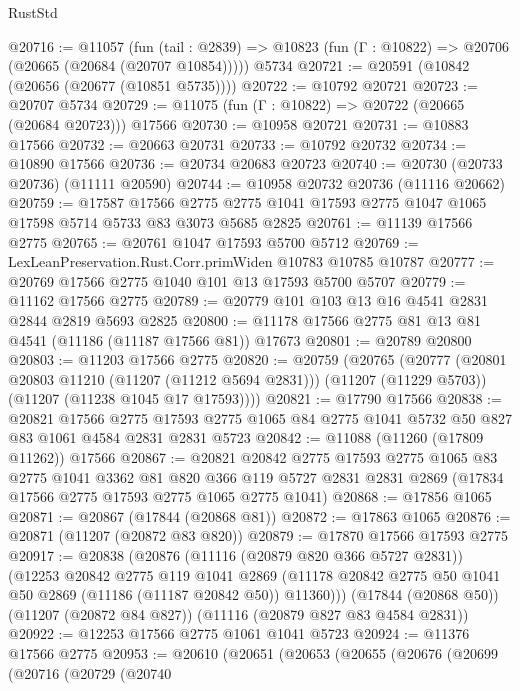 \begin{lexlean}{RustStd}
\begin{coremodule}
@20716 := @11057
    (fun (tail : @2839) => @10823 (fun (Γ : @10822) => @20706 (@20665 (@20684 (@20707 @10854)))))
    @5734
@20721 := @20591 (@10842 (@20656 (@20677 (@10851 @5735))))
@20722 := @10792 @20721
@20723 := @20707 @5734
@20729 := @11075 (fun (Γ : @10822) => @20722 (@20665 (@20684 @20723))) @17566
@20730 := @10958 @20721
@20731 := @10883 @17566
@20732 := @20663 @20731
@20733 := @10792 @20732
@20734 := @10890 @17566
@20736 := @20734 @20683 @20723
@20740 := @20730 (@20733 @20736) (@11111 @20590)
@20744 := @10958 @20732 @20736 (@11116 @20662)
@20759 := @17587
    @17566
    @2775
    @2775
    @1041
    @17593
    @2775
    @1047
    @1065
    @17598
    @5714
    @5733
    @83
    @3073
    @5685
    @2825
@20761 := @11139 @17566 @2775
@20765 := @20761 @1047 @17593 @5700 @5712
@20769 := LexLeanPreservation.Rust.Corr.primWiden @10783 @10785 @10787
@20777 := @20769 @17566 @2775 @1040 @101 @13 @17593 @5700 @5707
@20779 := @11162 @17566 @2775
@20789 := @20779 @101 @103 @13 @16 @4541 @2831 @2844 @2819 @5693 @2825
@20800 := @11178 @17566 @2775 @81 @13 @81 @4541 (@11186 (@11187 @17566 @81)) @17673
@20801 := @20789 @20800
@20803 := @11203 @17566 @2775
@20820 := @20759
    (@20765
      (@20777
        (@20801 @20803 @11210 (@11207 (@11212 @5694 @2831)))
        (@11207 (@11229 @5703))
        (@11207 (@11238 @1045 @17 @17593))))
@20821 := @17790 @17566
@20838 := @20821
    @17566
    @2775
    @17593
    @2775
    @1065
    @84
    @2775
    @1041
    @5732
    @50
    @827
    @83
    @1061
    @4584
    @2831
    @2831
    @5723
@20842 := @11088 (@11260 (@17809 @11262)) @17566
@20867 := @20821
    @20842
    @2775
    @17593
    @2775
    @1065
    @83
    @2775
    @1041
    @3362
    @81
    @820
    @366
    @119
    @5727
    @2831
    @2831
    @2869
    (@17834 @17566 @2775 @17593 @2775 @1065 @2775 @1041)
@20868 := @17856 @1065
@20871 := @20867 (@17844 (@20868 @81))
@20872 := @17863 @1065
@20876 := @20871 (@11207 (@20872 @83 @820))
@20879 := @17870 @17566 @17593 @2775
@20917 := @20838
    (@20876
      (@11116 (@20879 @820 @366 @5727 @2831))
      (@12253
        @20842
        @2775
        @119
        @1041
        @2869
        (@11178 @20842 @2775 @50 @1041 @50 @2869 (@11186 (@11187 @20842 @50)) @11360)))
    (@17844 (@20868 @50))
    (@11207 (@20872 @84 @827))
    (@11116 (@20879 @827 @83 @4584 @2831))
@20922 := @12253 @17566 @2775 @1061 @1041 @5723
@20924 := @11376 @17566 @2775
@20953 := @20610
    (@20651
      (@20653
        (@20655
          (@20676
            (@20699
              (@20716
                (@20729
                  (@20740

\end{coremodule}
\end{lexlean}
